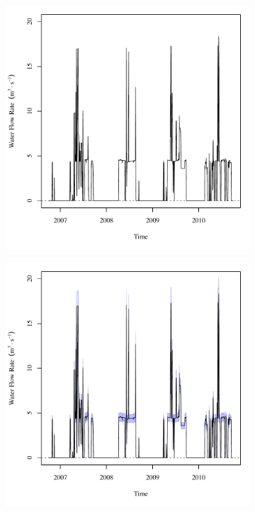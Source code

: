 \begin{linenumbers}
\begin{landscape}
\begin{figure}
\begin{subfigure}{0.7\textwidth}
			\includegraphics[width=\textwidth]{"Figures/Results_USR/Deterministic/Q HOL"}
		\end{subfigure}%
		\begin{subfigure}{0.7\textwidth}
			\centering
			\includegraphics[width=\textwidth]{"Figures/Results_USR/Stochastic/Q HOL"}

\end{subfigure}
\end{figure}
\end{landscape}
\end{linenumbers}
